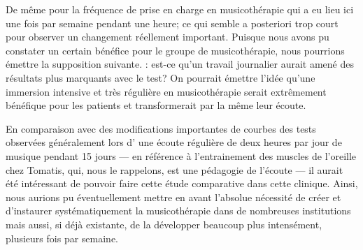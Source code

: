  
 

  
 
De même pour la fréquence de prise en charge en musicothérapie qui  a
eu lieu ici
  une fois par semaine pendant une heure;  ce qui semble a posteriori
  trop court pour observer un changement réellement important. Puisque nous avons pu
  constater un certain bénéfice pour le groupe de musicothérapie, nous
  pourrions émettre la supposition suivante. :  est-ce qu'un travail journalier
  aurait amené des résultats plus marquants avec le test?
  On pourrait émettre l'idée qu'une immersion intensive et très
  régulière en
  musicothérapie serait extrêmement bénéfique pour les patients et 
  transformerait par la même leur écoute. 

   En comparaison avec des
  modifications importantes de courbes des tests observées généralement  lors d' une écoute
  régulière de deux heures par jour de musique pendant 15 jours --- en
  référence à l'entrainement des muscles de l'oreille chez Tomatis,
  qui, nous le rappelons, est une pédagogie de l'écoute --- il aurait
  été intéressant de pouvoir faire cette étude comparative dans cette
  clinique. Ainsi, nous aurions pu éventuellement mettre en avant
  l'absolue nécessité de créer et d'instaurer systématiquement la
  musicothérapie dans de nombreuses institutions mais aussi, si déjà existante, de la
  développer beaucoup plus intensément, plusieurs fois par semaine.

